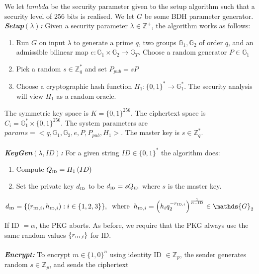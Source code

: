 \documentclass[11pt]{article}
\begin{document}
We let $lambda$ be the security parameter given to the setup algorithm such that a security level of 256 bits is realised. We let $G$ be some BDH parameter generator.
\textbf{\textit{Setup$\left( \lambda \right)$:}} Given a security parameter $\lambda \in \mathds{Z}^{+}$, the algorithm works as follows:
\begin{enumerate}
 \item Run $G$ on input $\lambda$ to generate a prime $q$, two groups $\mathds{G}_1, \mathds{G}_2$ of order $q$, and an admissible bilinear map $e: \mathds{G}_1 \times \mathds{G}_2 \rightarrow \mathds{G}_T$. Choose a random generator $P \in \mathds{G}_1$
 \item Pick a random $s \in \mathds{Z}^{*}_q$ and set $P_{pub} = sP$
 \item Choose a cryptographic hash function $H_1: \{ 0,1 \}^{*} \rightarrow \mathds{G}_1^{*}$. The security analysis will view $H_1$ as a random oracle.
\end{enumerate}

The symmetric key space is $K = \{ 0,1 \}^{256}$. The ciphertext space is $C_i = \mathds{G}_1^{*} \times \{ 0,1 \}^{256}$. The system parameters are $params = < q, \mathds{G}_1, \mathds{G}_2, e, P, P_{pub}, H_1  >$. The master key is $s \in \mathds{Z}_q^{*}$.\\
\\
\textbf{\textit{KeyGen$\left( \lambda,ID \right)$:}} For a given string $ID \in \{ 0,1 \}^{*}$ the algorithm does:
\begin{enumerate}
 \item Compute $Q_{\textrm{\tiny{ID}}} = H_1 \left( ID \right)$
 \item Set the private key $d_{\textrm{\tiny{ID}}}$ to be $d_{\textrm{\tiny{ID}}} = s Q_{\textrm{\tiny{ID}}}$ where $s$ is the master key.
\end{enumerate}


\begin{equation*}
 d_{\textrm{\tiny{ID}}} = \{ \left( r_{\textrm{\tiny{ID}},i}, h_{\textrm{\tiny{ID}},i} \right) : i \in \{ 1, 2, 3\}\}, \; \; \textrm{where} \; \; h_{\textrm{\tiny{ID}},i} = \left( h_{i}q_2^{-r_{\textrm{\tiny{ID}},i}} \right)^{\frac{1}{\alpha-\textrm{\tiny{ID}}}} \in \mathds{G}_2
\end{equation*}

If ID $ = \alpha $, the PKG aborts. As before, we require that the PKG always use the same random values $\{r_{\textrm{\tiny{ID}},i}\}$ for ID.\\
\\
\textbf{\textit{Encrypt:}} To encrypt $m \in \{ 1, 0 \}^n$ using identity ID $\in \mathds{Z}_p$, the sender generates random $s \in \mathds{Z}_p$, and sends the ciphertext
\end{document}

